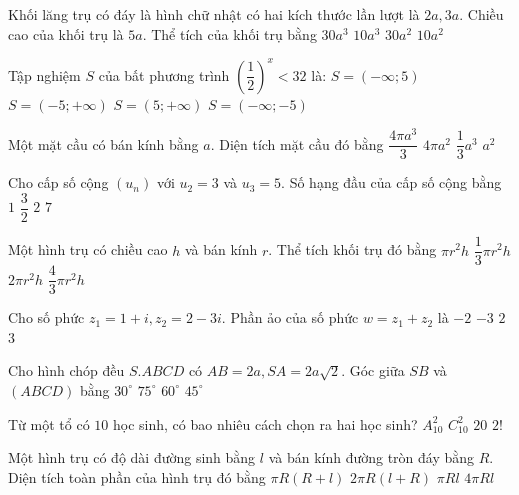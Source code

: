 \begin{ex}%
Khối lăng trụ có đáy là hình chữ nhật có hai kích thước lần lượt là $2 a, 3 a$. Chiều cao của khối trụ là $5 a$. Thể tích của khối trụ bằng
\choice
{\True $30 a^3$}
{$10 a^3$}
{$30 a^2$}
{$10 a^2$}

\end{ex}

\begin{ex}%
Tập nghiệm $S$ của bất phương trình $\left(\dfrac{1}{2}\right)^{x}<32$ là:
\choice
{$S=(-\infty; 5)$}
{\True $S=(-5;+\infty)$}
{$S=(5;+\infty)$}
{$S=(-\infty;-5)$}

\end{ex}
\begin{ex}%
Một mặt cầu có bán kính bằng $a$. Diện tích mặt cầu đó bằng
\choice
{$\dfrac{4\pi a^3}{3}$}
{\True $4\pi a^2$}
{$\dfrac{1}{3} a^3$}
{$a^2$}

\end{ex}
\begin{ex}%
Cho cấp số cộng $\left(u_n\right)$ với $u_2=3$ và $u_3=5$. Số hạng đầu của cấp số cộng bằng
\choice
{\True $1$}
{$\dfrac{3}{2}$}
{$2$}
{$7$}

\end{ex}
\begin{ex}%
Một hình trụ có chiều cao $h$ và bán kính $r$. Thể tích khối trụ đó bằng
\choice
{\True $\pi r^2 h$}
{$\dfrac{1}{3} \pi r^2 h$}
{$2\pi r^2 h$}
{$\dfrac{4}{3} \pi r^2 h$}

\end{ex}
\begin{ex}%
Cho số phức $z_1=1+i, z_2=2-3 i$. Phần ảo của số phức $w=z_1+z_2$ là
\choice
{\True $-2$}
{$-3$}
{$2$}
{$3$}

\end{ex}
\begin{ex}%
Cho hình chóp đều $S.ABCD$ có $AB=2 a, SA=2 a \sqrt{2}$. Góc giữa $SB$ và $(ABCD)$ bằng
\choice
{$30^{\circ}$}
{$75^{\circ}$}
{\True $60^{\circ}$}
{$45^{\circ}$}

\end{ex}
\begin{ex}%
Từ một tổ có $10$ học sinh, có bao nhiêu cách chọn ra hai học sinh?
\choice
{$A_{10}^2$}
{\True $C_{10}^2$}
{$20$}
{$2!$}

\end{ex}
\begin{ex}%
Một hình trụ có độ dài đường sinh bằng $l$ và bán kính đường tròn đáy bằng $R$. Diện tích toàn phần của hình trụ đó bằng
\choice
{$\pi R(R+l)$}
{\True $2\pi R(l+R)$}
{$\pi R l$}
{$4\pi R l$}

\end{ex}
